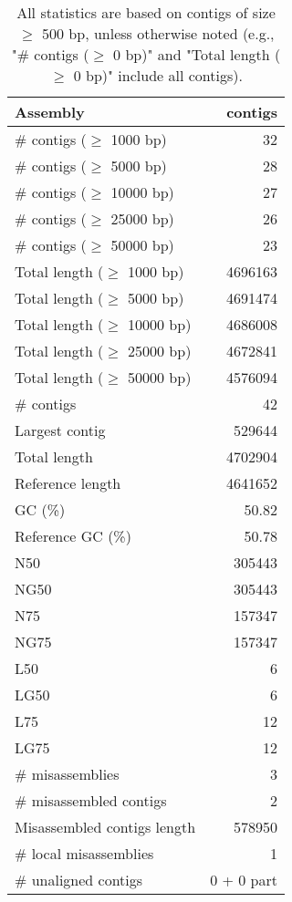 \documentclass[12pt,a4paper]{article}
\begin{document}
\begin{table}[ht]
\begin{center}
\caption{All statistics are based on contigs of size $\geq$ 500 bp, unless otherwise noted (e.g., "\# contigs ($\geq$ 0 bp)" and "Total length ($\geq$ 0 bp)" include all contigs).}
\begin{tabular}{|l*{1}{|r}|}
\hline
Assembly & contigs \\ \hline
\# contigs ($\geq$ 1000 bp) & 32 \\ \hline
\# contigs ($\geq$ 5000 bp) & 28 \\ \hline
\# contigs ($\geq$ 10000 bp) & 27 \\ \hline
\# contigs ($\geq$ 25000 bp) & 26 \\ \hline
\# contigs ($\geq$ 50000 bp) & 23 \\ \hline
Total length ($\geq$ 1000 bp) & 4696163 \\ \hline
Total length ($\geq$ 5000 bp) & 4691474 \\ \hline
Total length ($\geq$ 10000 bp) & 4686008 \\ \hline
Total length ($\geq$ 25000 bp) & 4672841 \\ \hline
Total length ($\geq$ 50000 bp) & 4576094 \\ \hline
\# contigs & 42 \\ \hline
Largest contig & 529644 \\ \hline
Total length & 4702904 \\ \hline
Reference length & 4641652 \\ \hline
GC (\%) & 50.82 \\ \hline
Reference GC (\%) & 50.78 \\ \hline
N50 & 305443 \\ \hline
NG50 & 305443 \\ \hline
N75 & 157347 \\ \hline
NG75 & 157347 \\ \hline
L50 & 6 \\ \hline
LG50 & 6 \\ \hline
L75 & 12 \\ \hline
LG75 & 12 \\ \hline
\# misassemblies & 3 \\ \hline
\# misassembled contigs & 2 \\ \hline
Misassembled contigs length & 578950 \\ \hline
\# local misassemblies & 1 \\ \hline
\# unaligned contigs & 0 + 0 part \\ \hline

\end{tabular}
\end{center}
\end{table}
\end{document}
